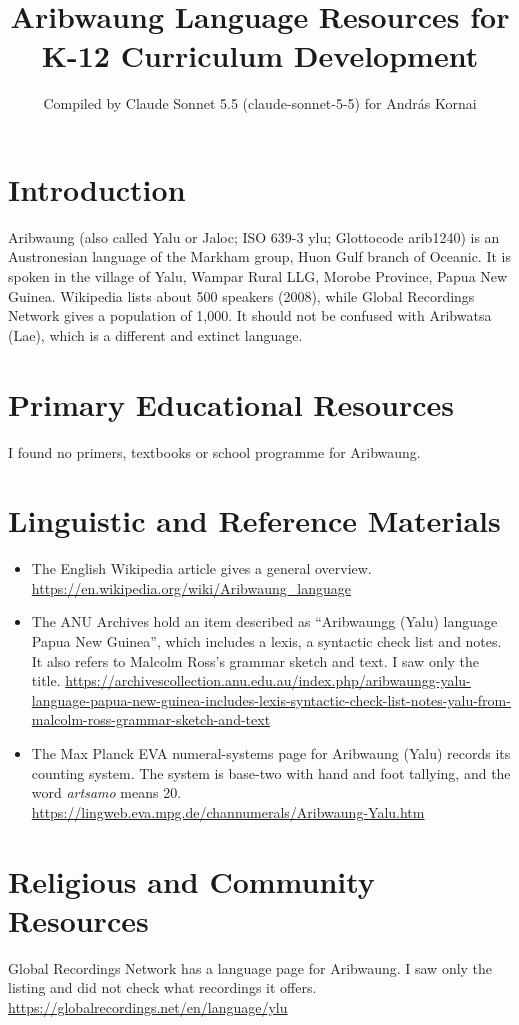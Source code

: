 \documentclass[12pt]{article}
\title{Aribwaung Language Resources for K-12 Curriculum Development}
\author{Compiled by Claude Sonnet 5.5 (claude-sonnet-5-5) for Andr\'as Kornai}
\date{}
\begin{document}
\maketitle

\section{Introduction}
Aribwaung (also called Yalu or Jaloc; ISO 639-3 ylu; Glottocode arib1240) is an Austronesian language of the Markham group, Huon Gulf branch of Oceanic. It is spoken in the village of Yalu, Wampar Rural LLG, Morobe Province, Papua New Guinea. Wikipedia lists about 500 speakers (2008), while Global Recordings Network gives a population of 1,000. It should not be confused with Aribwatsa (Lae), which is a different and extinct language.

\section{Primary Educational Resources}
I found no primers, textbooks or school programme for Aribwaung.

\section{Linguistic and Reference Materials}
\begin{itemize}
\item The English Wikipedia article gives a general overview. \url{https://en.wikipedia.org/wiki/Aribwaung_language}
\item The ANU Archives hold an item described as ``Aribwaungg (Yalu) language Papua New Guinea'', which includes a lexis, a syntactic check list and notes. It also refers to Malcolm Ross's grammar sketch and text. I saw only the title. \url{https://archivescollection.anu.edu.au/index.php/aribwaungg-yalu-language-papua-new-guinea-includes-lexis-syntactic-check-list-notes-yalu-from-malcolm-ross-grammar-sketch-and-text}
\item The Max Planck EVA numeral-systems page for Aribwaung (Yalu) records its counting system. The system is base-two with hand and foot tallying, and the word \emph{artsamo} means 20. \url{https://lingweb.eva.mpg.de/channumerals/Aribwaung-Yalu.htm}
\end{itemize}

\section{Religious and Community Resources}
Global Recordings Network has a language page for Aribwaung. I saw only the listing and did not check what recordings it offers. \url{https://globalrecordings.net/en/language/ylu}
\end{document}
